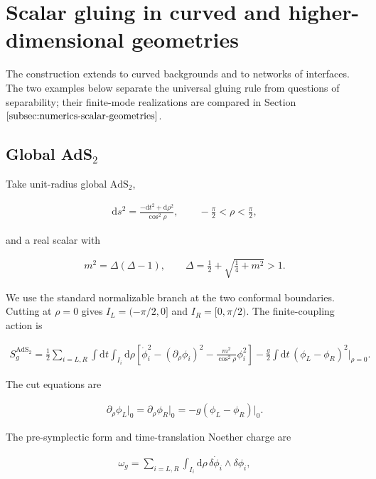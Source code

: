 \section{Scalar gluing in curved and higher-dimensional geometries}\label{sec:scalar-geometries}

The construction extends to curved backgrounds and to networks of interfaces. The two examples below separate the universal gluing rule from questions of separability; their finite-mode realizations are compared in Section $\ref{subsec:numerics-scalar-geometries}$.

\subsection{\texorpdfstring{Global AdS$_2$}{Global AdS2}}\label{subsec:global-ads2}

Take unit-radius global $\mathrm{AdS}_2$,

\begin{align}
\mathrm ds^2=\frac{-\mathrm dt^2+\mathrm d\rho^2}{\cos^2\rho},
\qquad
-\frac\pi2<\rho<\frac\pi2,
\end{align}

and a real scalar with

\begin{align}
m^2=\Delta(\Delta-1),
\qquad
\Delta=\frac12+\sqrt{\frac14+m^2}>1.
\end{align}

We use the standard normalizable branch at the two conformal boundaries. Cutting at $\rho=0$ gives $I_L=(-\pi/2,0]$ and $I_R=[0,\pi/2)$. The finite-coupling action is

\begin{align}
S_g^{\mathrm{AdS}_2}
=\frac12\sum_{i=L,R}\int\mathrm dt\int_{I_i}\mathrm d\rho
\left[
\dot\phi_i^2-(\partial_\rho\phi_i)^2
-\frac{m^2}{\cos^2\rho}\phi_i^2
\right]
-\frac g2\int\mathrm dt\,(\phi_L-\phi_R)^2\big|_{\rho=0}.
\end{align}

The cut equations are

\begin{align}
\partial_\rho\phi_L\big|_0
=\partial_\rho\phi_R\big|_0
=-g(\phi_L-\phi_R)\big|_0.
\end{align}

The pre-symplectic form and time-translation Noether charge are

\begin{align}
\omega_g
=\sum_{i=L,R}\int_{I_i}\mathrm d\rho\,
\delta\dot\phi_i\wedge\delta\phi_i,
\end{align}


